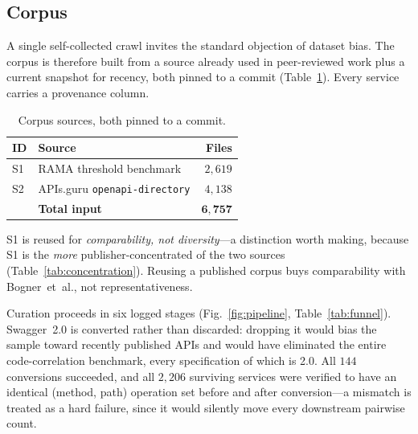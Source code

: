 \documentclass[journal]{IEEEtran}
\newcommand{\code}[1]{\texttt{\small #1}}
\begin{document}
\subsection{Corpus}
\label{sec:design-corpus}
A single self-collected crawl invites the standard objection of dataset bias.
The corpus is therefore built from a source already used in peer-reviewed
work plus a current snapshot for recency, both pinned to a commit
(Table~\ref{tab:sources}). Every service carries a provenance column.

\begin{table}[!t]
\caption{Corpus sources, both pinned to a commit.}
\label{tab:sources}
\centering
\footnotesize
\begin{tabular}{@{}llr@{}}
\toprule
\textbf{ID} & \textbf{Source} & \textbf{Files} \\
\midrule
S1 & RAMA threshold benchmark~\cite{bogner2020rama} & $2{,}619$ \\
S2 & APIs.guru \code{openapi-directory} & $4{,}138$ \\
\midrule
   & \textbf{Total input} & $\mathbf{6{,}757}$ \\
\bottomrule
\end{tabular}
\end{table}

S1 is reused for \emph{comparability, not diversity}---a distinction worth
making, because S1 is the \emph{more} publisher-concentrated of the two sources
(Table~\ref{tab:concentration}). Reusing a published corpus buys comparability
with Bogner~et~al., not representativeness.

Curation proceeds in six logged stages (Fig.~\ref{fig:pipeline},
Table~\ref{tab:funnel}). Swagger~2.0 is converted rather than discarded:
dropping it would bias the sample toward recently published APIs and would have
eliminated the entire code-correlation benchmark, every specification of which
is 2.0. All $144$ conversions succeeded, and all $2{,}206$ surviving services
were verified to have an identical (method, path) operation set before and after
conversion---a mismatch is treated as a hard failure, since it would silently
move every downstream pairwise count.
\end{document}
